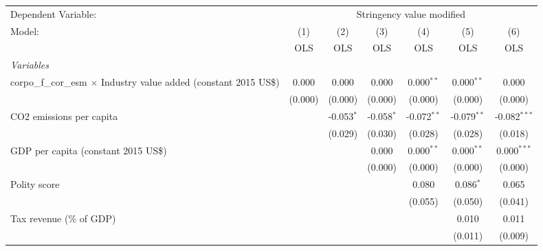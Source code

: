 
\begingroup
\centering
\begin{tabular}{lcccccc}
   \toprule
   Dependent Variable: & \multicolumn{6}{c}{Stringency value modified}\\
   Model:                                                                     & (1)     & (2)          & (3)          & (4)           & (5)           & (6)\\  
                                                                              &  OLS    & OLS          & OLS          & OLS           & OLS           & OLS\\  
   \midrule
   \emph{Variables}\\
   corpo\_f\_cor\_esm $\times$ Industry value added (constant 2015 US\$)      & 0.000   & 0.000        & 0.000        & 0.000$^{**}$  & 0.000$^{**}$  & 0.000\\   
                                                                              & (0.000) & (0.000)      & (0.000)      & (0.000)       & (0.000)       & (0.000)\\   
   CO2 emissions per capita                                                   &         & -0.053$^{*}$ & -0.058$^{*}$ & -0.072$^{**}$ & -0.079$^{**}$ & -0.082$^{***}$\\   
                                                                              &         & (0.029)      & (0.030)      & (0.028)       & (0.028)       & (0.018)\\   
   GDP per capita (constant 2015 US\$)                                        &         &              & 0.000        & 0.000$^{**}$  & 0.000$^{**}$  & 0.000$^{***}$\\   
                                                                              &         &              & (0.000)      & (0.000)       & (0.000)       & (0.000)\\   
   Polity score                                                               &         &              &              & 0.080         & 0.086$^{*}$   & 0.065\\   
                                                                              &         &              &              & (0.055)       & (0.050)       & (0.041)\\   
   Tax revenue (\% of GDP)                                                    &         &              &              &               & 0.010         & 0.011\\   
                                                                              &         &              &              &               & (0.011)       & (0.009)\\   

\end{tabular}
